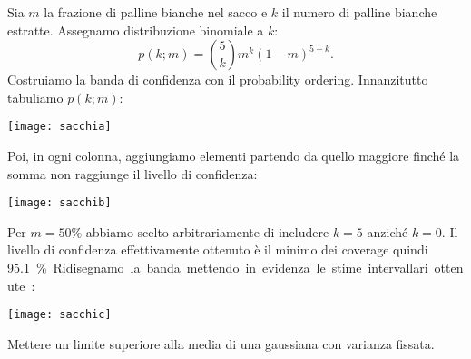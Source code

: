 


\begin{solution*}
	Sia $m$ la frazione di palline bianche nel sacco
	e $k$ il numero di palline bianche estratte.
	Assegnamo distribuzione binomiale a $k$:
	\begin{equation*}
		p(k;m)
		= \binom 5k m^k (1-m)^{5-k}.
	\end{equation*}
	Costruiamo la banda di confidenza con il probability ordering.
	Innanzitutto tabuliamo $p(k;m)$:
	\begin{center}
		\texttt{[image: sacchia]}
	\end{center}
	Poi, in ogni colonna,
	aggiungiamo elementi partendo da quello maggiore finché la somma non raggiunge
	il livello di confidenza:
	\begin{center}
		\texttt{[image: sacchib]}
	\end{center}
	Per $m=\SI{50}\%$ abbiamo scelto arbitrariamente di includere $k=5$ anziché $k=0$.
	Il livello di confidenza effettivamente ottenuto è il minimo dei coverage quindi \SI{95.1}\%.
	Ridisegnamo la banda mettendo in evidenza le stime intervallari ottenute:
	\begin{center}
		\texttt{[image: sacchic]}
	\end{center}
\end{solution*}

\begin{exercise}
	\label{th:gausssup}
	Mettere un limite superiore alla media di una gaussiana con varianza fissata.
\end{exercise}

